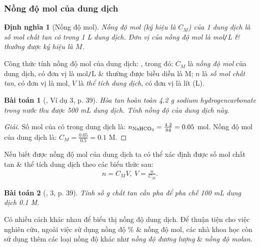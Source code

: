 \documentclass{article}
\newtheorem{baitoan}{Bài toán}
\newtheorem{dinhnghia}{Định nghĩa}
\begin{document}
\subsubsection{Nồng độ mol của dung dịch}

\begin{dinhnghia}[Nồng độ mol]
	\emph{Nồng độ mol} (ký hiệu là $C_M$) của 1 dung dịch là số mol chất tan có trong \emph{1 L} dung dịch. Đơn vị của nồng độ mol là \emph{mol\texttt{/}L} \& thường được ký hiệu là $M$.
\end{dinhnghia}
Công thức tính nồng độ mol của dung dịch: , trong đó: $C_M$ là \textit{nồng độ mol} của dung dịch, có đơn vị là mol\texttt{/}L \& thường được biễu diễn là M; $n$ là \textit{số mol chất tan}, có đơn vị là mol, $V$ là \textit{thể tích dung dịch}, có đơn vị là lít (L).

\begin{baitoan}[\cite{SGK_KHTN_8_Canh_Dieu}, Ví dụ 3, p. 39]
	Hòa tan hoàn toàn \emph{4.2 g} sodium hydrogencarbonate \emph{} trong nước thu được \emph{500 mL} dung dịch. Tính nồng độ của dung dịch này.
\end{baitoan}

\begin{proof}[Giải]
	Số mol của  có trong dung dịch là: $n_{\rm NaHCO_3} = \frac{4.2}{84} = 0.05$ mol. Nồng độ mol của dung dịch  là: $C_M = \frac{0.05}{0.5} = 0.1$ M.
\end{proof}
Nếu biết được nồng độ mol của dung dịch ta có thể xác định được số mol chất tan \& thể tích dung dịch theo các biểu thức sau:
\begin{align*}
	\boxed{n = C_MV,\ V = \frac{n}{C_M}.}
\end{align*}

\begin{baitoan}[\cite{SGK_KHTN_8_Canh_Dieu}, 3, p. 39]
	Tính số \emph{g} chất tan cần pha để pha chế \emph{100 mL} dung dịch \emph{ 0.1 M}.
\end{baitoan}
Có nhiều cách khác nhau để biểu thị nồng độ dung dịch. Để thuận tiện cho việc nghiên cứu, ngoài việc sử dụng nồng độ \% \& nồng độ mol, các nhà khoa học còn sử dụng thêm các loại nồng độ khác như \textit{nồng độ đương lượng} \& \textit{nồng độ molan}.
\end{document}
